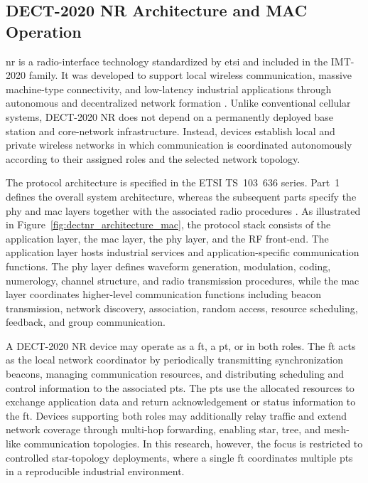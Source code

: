 \documentclass[12pt,a4paper]{article}
\begin{document}
\subsection{DECT-2020 NR Architecture and MAC Operation}
\label{subsec:dect-architecture-mac}
\gls{nr} is a radio-interface technology standardized by \gls{etsi} and included in the IMT-2020 family. It was developed to support local wireless communication, massive machine-type connectivity, and low-latency industrial applications through autonomous and decentralized network formation \cite{kovalchukovDECT2020NewRadio2022,dhanwaniAssessmentCandidateTechnology2020}. Unlike conventional cellular systems, DECT-2020 NR does not depend on a permanently deployed base station and core-network infrastructure. Instead, devices establish local and private wireless networks in which communication is coordinated autonomously according to their assigned roles and the selected network topology.

The protocol architecture is specified in the ETSI TS~103~636 series. Part~1 defines the overall system architecture, whereas the subsequent parts specify the \gls{phy} and \gls{mac} layers together with the associated radio procedures \cite{etsi_ts103636_1,etsi_ts103636_2,etsi_ts103636_3,etsi_ts103636_4}. As illustrated in Figure~\ref{fig:dectnr_architecture_mac}, the protocol stack consists of the application layer, the \gls{mac} layer, the \gls{phy} layer, and the RF front-end. The application layer hosts industrial services and application-specific communication functions. The \gls{phy} layer defines waveform generation, modulation, coding, numerology, channel structure, and radio transmission procedures, while the \gls{mac} layer coordinates higher-level communication functions including beacon transmission, network discovery, association, random access, resource scheduling, feedback, and group communication.

A DECT-2020 NR device may operate as a \gls{ft}, a \gls{pt}, or in both roles. The \gls{ft} acts as the local network coordinator by periodically transmitting synchronization beacons, managing communication resources, and distributing scheduling and control information to the associated \glspl{pt}. The \glspl{pt} use the allocated resources to exchange application data and return acknowledgement or status information to the \gls{ft}. Devices supporting both roles may additionally relay traffic and extend network coverage through multi-hop forwarding, enabling star, tree, and mesh-like communication topologies. In this research, however, the focus is restricted to controlled star-topology deployments, where a single \gls{ft} coordinates multiple \glspl{pt} in a reproducible industrial environment.
\end{document}
